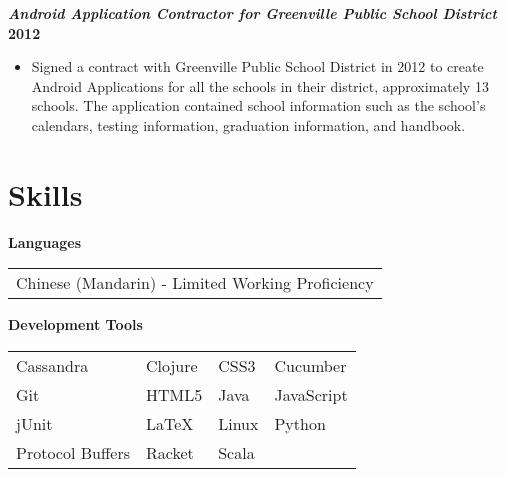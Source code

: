 \documentclass[10pt]{res}
\begin{document}
\begin{resume}
	\textbf{\textit{Android Application Contractor for Greenville Public School District}}
	\vspace*{.25em}
	\hfill {\bf 2012}
	\begin{itemize}
		\item Signed a contract with Greenville Public School District in 2012 to create Android Applications for all the schools in their district, approximately 13 schools. The application contained school information such as the school's calendars, testing information, graduation information, and handbook.
	\end{itemize}
	
\section{Skills}
\textbf{Languages} \\ 
	\begin{tabular}{ l }
		Chinese (Mandarin) - Limited Working Proficiency
	\end{tabular}
	
	\vspace{1pt}
\textbf{Development Tools} \\
	\begin{tabular}{  l    l    l    l  }
		Cassandra 			& Clojure 			& 	CSS3 	 		&   Cucumber    \\ 	
		Git	 				& HTML5 			&   Java  			& 	JavaScript 	\\
		jUnit  	 			& LaTeX   			&   Linux 			&	Python   	\\	
		Protocol Buffers   	& Racket         	&	Scala							
	\end{tabular}
\end{resume}
\end{document}
